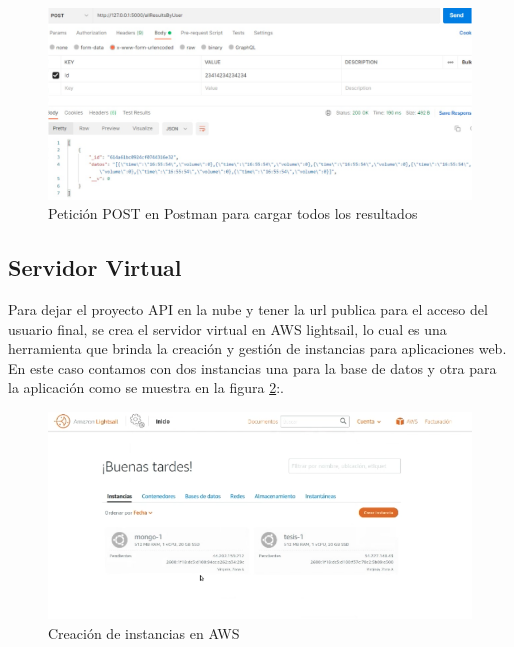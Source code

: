\documentclass[12pt]{article}
\begin{document}
\begin{enumerate}
            
            \begin{figure}[ht]
            \centering
            \includegraphics[scale=0.25]{imag/resultsbyuser.png}
            \caption{Petición POST en Postman para cargar todos los resultados }
            \label{22}
            \end{figure}
            \FloatBarrier
    
    
\end{enumerate}



\newpage

\subsection{Servidor Virtual}

Para dejar el proyecto API en la nube y tener la url publica para el acceso del usuario final, se crea el servidor virtual en AWS lightsail, lo cual es una herramienta que brinda la creación y gestión de instancias para aplicaciones web. En este caso contamos con dos instancias una para la base de datos y otra para la aplicación como se muestra en la figura \ref{23}:.

\begin{figure}[ht]
\centering
\includegraphics[scale=0.4]{imag/maquinasAWS.png}
\caption{Creación de instancias en AWS }
\label{23}
\end{figure}
\FloatBarrier
\end{document}
